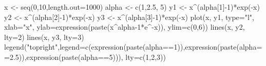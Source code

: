 \begin{Schunk}
\begin{Sinput}
 x <- seq(0,10,length.out=1000)
 alpha <- c(1,2.5, 5)
 y1 <- x^(alpha[1]-1)*exp(-x)
 y2 <- x^(alpha[2]-1)*exp(-x)
 y3 <- x^(alpha[3]-1)*exp(-x)
 plot(x, y1, type="l", xlab="x", ylab=expression(paste(x^{alpha-1}*e^{-x})),  ylim=c(0,6))
 lines(x, y2, lty=2)
 lines(x, y3, lty=3)
 legend("topright",legend=c(expression(paste(alpha==1)),expression(paste(alpha==2.5)),expression(paste(alpha==5))), lty=c(1,2,3))
\end{Sinput}
\end{Schunk}
